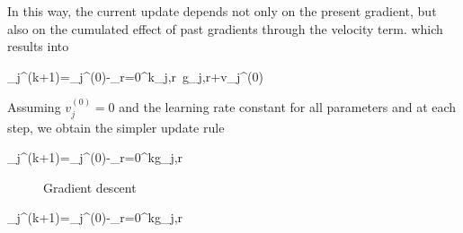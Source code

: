 In this way, the current update depends not only on the present gradient, but also on the cumulated effect of past gradients through the velocity term.
which results into
\begin{myequation}
	\theta_j^{(k+1)}=\theta_j^{(0)}-\sum_{r=0}^k\eta_{j,r}\, g_{j,r}+v_j^{(0)}
\end{myequation}

Assuming $v_j^{(0)}=0$ and the learning rate constant for all parameters and at each step, we obtain the simpler update rule
\begin{myequation}
	\theta_j^{(k+1)}=\theta_j^{(0)}-\eta\sum_{r=0}^kg_{j,r}
\end{myequation}

\begin{figure}[h]
 \begin{center}
 \end{center}
\caption{Gradient descent}
\label{fig:gd}
 \end{figure}
 
 
\begin{myequation}
	\theta_j^{(k+1)}=\theta_j^{(0)}-\eta\sum_{r=0}^kg_{j,r}
\end{myequation}

